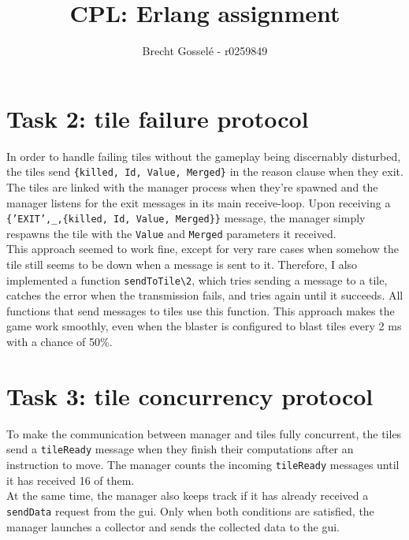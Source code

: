 \documentclass{article}
\begin{document}
\title{CPL: Erlang assignment}
\author{Brecht Gossel\'e - r0259849}
\maketitle

\section{Task 2: tile failure protocol}

In order to handle failing tiles without the gameplay being discernably disturbed, the tiles send \texttt{\{killed, Id, Value, Merged\}} in the reason clause when they exit. The tiles are linked with the manager process when they're spawned and the manager listens for the exit messages in its main receive-loop. Upon receiving a \texttt{\{'EXIT',\_,\{killed, Id, Value, Merged\}\}} message, the manager simply respawns the tile with the \texttt{Value} and \texttt{Merged} parameters it received. \\This approach seemed to work fine, except for very rare cases when somehow the tile still seems to be down when a message is sent to it. Therefore, I also implemented a function \texttt{sendToTile\textbackslash2}, which tries sending a message to a tile, catches the error when the transmission fails, and tries again until it succeeds. All functions that send messages to tiles use this function. This approach makes the game work smoothly, even when the blaster is configured to blast tiles every 2 ms with a chance of 50\%.

\section{Task 3: tile concurrency protocol}

To make the communication between manager and tiles fully concurrent, the tiles send a \texttt{tileReady} message when they finish their computations after an instruction to move. The manager counts the incoming \texttt{tileReady} messages until it has received 16 of them.\\
At the same time, the manager also keeps track if it has already received a \texttt{sendData} request from the gui. Only when both conditions are satisfied, the manager launches a collector and sends the collected data to the gui. 
\end{document}
